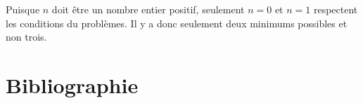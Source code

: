 \documentclass[11pt]{article}
\numberwithin{equation}{section}
\begin{document}
Puisque $n$ doit être un nombre entier positif, seulement $n=0$ et $n=1$ respectent les conditions du problèmes. Il y a donc seulement deux minimums possibles et non trois.

\section*{Bibliographie}

\renewcommand{\section}[2]{}

\end{document}
